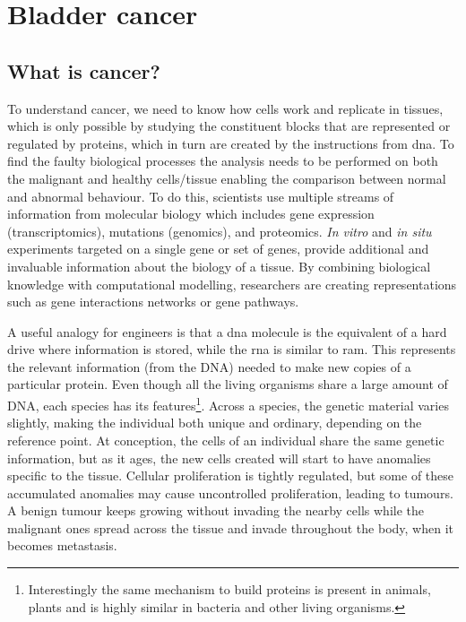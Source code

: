 
\section{Bladder cancer} \label{s:lit:biology}

\vspace{3mm}
\vspace{3mm}

\subsection{What is cancer?}

To understand cancer, we need to know how cells work and replicate in tissues, which is only possible by studying the constituent blocks that are represented or regulated by proteins, which in turn are created by the instructions from \acrfull{dna}. To find the faulty biological processes the analysis needs to be performed on both the malignant and healthy cells/tissue enabling the comparison between normal and abnormal behaviour. To do this, scientists use multiple streams of information from molecular biology which includes gene expression (transcriptomics), mutations (genomics), and proteomics. \textit{In vitro} and \textit{in situ} experiments targeted on a single gene or set of genes, provide additional and invaluable information about the biology of a tissue. By combining biological knowledge with computational modelling, researchers are creating representations such as gene interactions networks or gene pathways. 

A useful analogy for engineers is that a \acrshort{dna} molecule is the equivalent of a hard drive where information is stored, while the \acrfull{rna} is similar to \acrfull{ram}. This represents the relevant information (from the DNA) needed to make new copies of a particular protein. Even though all the living organisms share a large amount of DNA, each species has its features\footnote{Interestingly the same mechanism to build proteins is present in animals, plants and is highly similar in bacteria and other living organisms.}. Across a species, the genetic material varies slightly, making the individual both unique and ordinary, depending on the reference point. At conception, the cells of an individual share the same genetic information, but as it ages, the new cells created will start to have anomalies specific to the tissue. Cellular proliferation is tightly regulated, but some of these accumulated anomalies may cause uncontrolled proliferation, leading to tumours. A benign tumour keeps growing without invading the nearby cells while the malignant ones spread across the tissue and invade throughout the body, when it becomes metastasis. 

